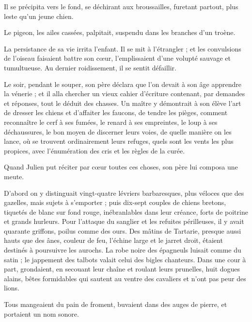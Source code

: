\documentclass[]{book}
\begin{document}
                Il se précipita vers le fond, se déchirant aux broussailles, furetant partout, plus leste qu'un jeune chien.
                    
                Le pigeon, les ailes cassées, palpitait, suspendu dans les branches d'un troène.
                    
                La persistance de sa vie irrita l'enfant. Il se mit à l'étrangler ; et les convulsions de l'oiseau faisaient battre son cœur, l'emplissaient d'une volupté sauvage et tumultueuse. Au dernier roidissement, il se sentit défaillir.
                    
                Le soir, pendant le souper, son père déclara que l'on devait à son âge apprendre la vénerie ; et il alla chercher un vieux cahier d'écriture contenant, par demandes et réponses, tout le déduit des chasses. Un maître y démontrait à son élève l'art de dresser les chiens et d'affaiter les faucons, de tendre les pièges, comment reconnaître le cerf à ses fumées, le renard à ses empreintes, le loup à ses déchaussures, le bon moyen de discerner leurs voies, de quelle manière on les lance, où se trouvent ordinairement leurs refuges, quels sont les vents les plus propices, avec l'énumération des cris et les règles de la curée.
                    
                Quand Julien put réciter par cœur toutes ces choses, son père lui composa une meute.
                    
                D'abord on y distinguait vingt-quatre lévriers barbaresques, plus véloces que des gazelles, mais sujets à s'emporter ; puis dix-sept couples de chiens bretons, tiquetés de blanc sur fond rouge, inébranlables dans leur créance, forts de poitrine et grands hurleurs. Pour l'attaque du sanglier et les refuites périlleuses, il y avait quarante griffons, poilus comme des ours. Des mâtins de Tartarie, presque aussi hauts que des ânes, couleur de feu, l'échine large et le jarret droit, étaient destinés à poursuivre les aurochs. La robe noire des épagneuls luisait comme du satin ; le jappement des talbots valait celui des bigles chanteurs. Dans une cour à part, grondaient, en secouant leur chaîne et roulant leurs prunelles, huit dogues alains, bêtes formidables qui sautent au ventre des cavaliers et n'ont pas peur des lions.
                    
                Tous mangeaient du pain de froment, buvaient dans des auges de pierre, et portaient un nom sonore.
                    
\end{document}
